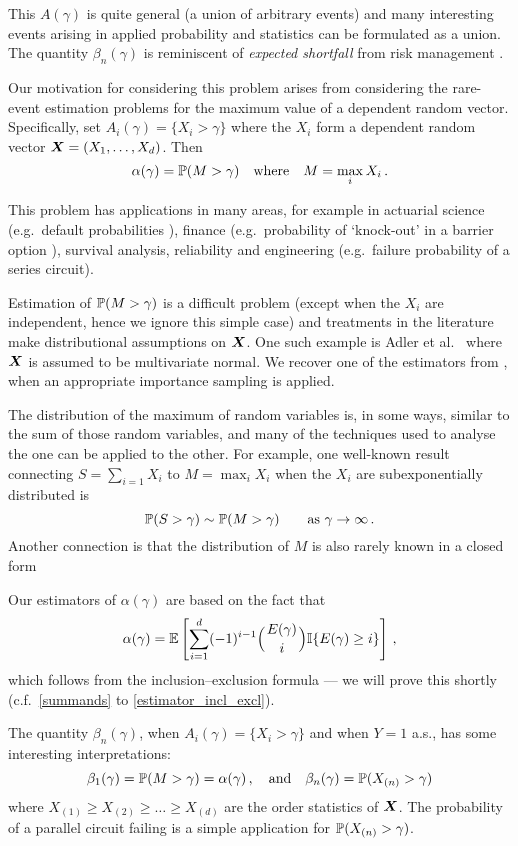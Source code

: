 This $A(\gamma)$ is quite general (a union of arbitrary events) and many interesting events arising in applied probability and statistics can be
formulated as a union. The quantity $\beta_n(\gamma)$ is reminiscent of \emph{expected shortfall} from risk management \cite{mcneil2015quantitative}.

Our motivation for considering this problem arises from considering the rare-event estimation problems for the maximum value of a dependent random vector. Specifically, set $A_i(\gamma) = \{X_i > \gamma\}$ where the $X_i$ form a dependent random vector $\bm{X} = (X_1, \dots, X_d)$. Then
\[ \alpha(\gamma) = \operatorname{{\mathbb P}}(M > \gamma) \quad \text{where} \quad M = \max_{i} X_i \,. \]

This problem has applications in many areas, for example in actuarial science (e.g.\ default probabilities \cite{asmussen2010ruin}), finance (e.g.\ probability of `knock-out' in a barrier option \cite{cont2010encyclopedia}), survival analysis, reliability \cite{rausand2004system} and engineering (e.g.\ failure probability of a series circuit).

Estimation of $\operatorname{{\mathbb P}}(M > \gamma)$ is a difficult problem (except when the $X_i$ are independent, hence we ignore this simple case) and treatments in the literature make distributional assumptions on $\bm{X}$.
One such example is Adler et al.\ \cite{adler2012efficient} where $\bm{X}$ is assumed to be multivariate normal. We recover one of the estimators from \cite{adler2012efficient}, when an appropriate importance sampling is applied.

The distribution of the maximum of random variables is, in some ways, similar to the sum of those random variables, and many of the techniques used to analyse the one can be applied to the other. For example, one well-known result connecting $S = \sum_{i=1} X_i$ to $M = \max_i X_i$ when the $X_i$ are subexponentially distributed is
\[ \operatorname{{\mathbb P}}(S > \gamma) \sim \operatorname{{\mathbb P}}(M > \gamma) \qquad \text{as } \gamma \to \infty\,. \]
Another connection is that the distribution of $M$ is also rarely known in a closed form

Our estimators of $\alpha(\gamma)$ are based on the fact that
\[
\alpha(\gamma) = \Exp \left[ \sum_{i=1}^d (-1)^{i-1} \BigBinom{E(\gamma)}{i} \ind{E(\gamma) \ge i} \right] \,,
\]
which follows from the inclusion--exclusion formula --- we will prove this shortly (c.f.\ \eqref{summands} to \eqref{estimator_incl_excl}).

The quantity $\beta_n(\gamma)$, when $A_i(\gamma) = \{X_i > \gamma\}$ and when $Y=1$ a.s., has some interesting interpretations:
\[ \beta_1(\gamma) = \operatorname{{\mathbb P}}(M > \gamma) = \alpha(\gamma) \,, \quad \text{and} \quad
 \beta_n(\gamma) = \operatorname{{\mathbb P}}(X_{(n)} > \gamma) \]
where $X_{(1)} \ge X_{(2)} \ge \dots \ge X_{(d)}$ are the order statistics of $\bm{X}$. The probability of a parallel circuit failing is a simple application for $\operatorname{{\mathbb P}}(X_{(n)} > \gamma)$.

